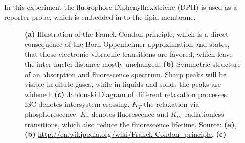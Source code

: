 \documentclass[draft]{scrartcl}
\numberwithin{equation}{section}
\numberwithin{figure}{section}
\numberwithin{table}{section}
\begin{document}
In this experiment the fluorophore Diphenylhexatriene (DPH) is used as a reporter probe, which is embedded in to the lipid membrane.

\begin{figure}
\centering
{}
\hfill
{}

\caption{ \small \textbf{(a)} Illustration of the Franck-Condon principle, which is a direct consequence of the Born-Oppenheimer approximation and states, that those electronic-vibraonic transitions are favored, which leave the inter-nuclei distance mostly unchanged. 
\textbf{(b)} Symmetric structure of an absorption and fluorescence spectrum. Sharp peaks will be visible in dilute gases, while in liquids and solids the peaks are widened. 
\textbf{(c)} Jablonski Diagram of different relaxation processes. ISC denotes intersystem crossing. $K_T$ the relaxation via phosphorescence. $K_r$ denotes fluorescence and $K_{nr}$ radiationless transitions, which also reduce the fluorescence lifetime. \footnotesize Source: \textbf{(a)}, \textbf{(b)} \url{http://en.wikipedia.org/wiki/Franck-Condon_principle}, \textbf{(c)} \cite{omg}}
\label{condon}
\end{figure}
\end{document}
